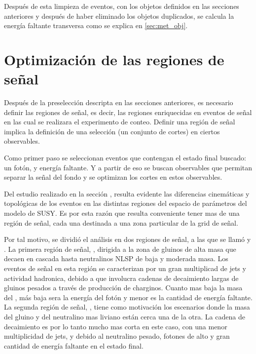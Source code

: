 Después de esta limpieza de eventos, con los objetos definidos en las secciones anteriores y después
de haber eliminado los objetos duplicados, se calcula la energía faltante transversa como se explica
en \cref{sec:met_obj}.



\section{Optimización de las regiones de señal}

Después de la preselección descripta en las secciones anteriores, es necesario
definir las regiones de señal, es decir, las regiones enriquecidas en eventos
de señal en las cual se realizara el experimento de conteo.
 Definir una región de señal implica la definición de una selección (un conjunto
 de cortes) en ciertos observables.


Como primer paso se seleccionan eventos que contengan el estado final buscado:
un fotón, y energía faltante. Y a partir de eso se buscan observables que
permitan separar la señal del fondo y se optimizan los cortes en estos observables.



Del estudio realizado en la sección {\XXX}, resulta evidente las diferencias
cinemáticas y topológicas de los eventos en las distintas regiones del
espacio de parámetros {\mgmn} del modelo de SUSY.
Es por esta razón que resulta conveniente tener mas de una región de señal,
cada una destinada a una zona particular de la grid de señal.


Por tal motivo, se dividió el análisis en dos regiones de señal, a las que se
llamó {\SRL} y {\SRH}.
La primera región de señal, \SRL, dirigida a la zona de gluinos de alta masa que
decaen en cascada hasta neutralinos NLSP de baja y moderada masa. Los eventos de
señal en esta región se caracterizan por un gran multiplicad de jets y actividad
hadronica, debido a que involucra cadenas de decaimiento largas de gluinos
pesados a través de producción de charginos. Cuanto mas baja la masa del
{\ninoone}, más baja sera la energía del fotón y menor es la cantidad de
energía faltante.
La segunda región de señal, \SRH, tiene como motivación los escenarios donde la
masa del gluino y del neutralino mas liviano están cerca una de la otra. La
cadena de decaimiento es por lo tanto mucho mas corta en este caso, con una
menor multiplicidad de jets, y debido al neutralino pesado, fotones de alto
{\pt} y gran cantidad de energía faltante en el estado final.

